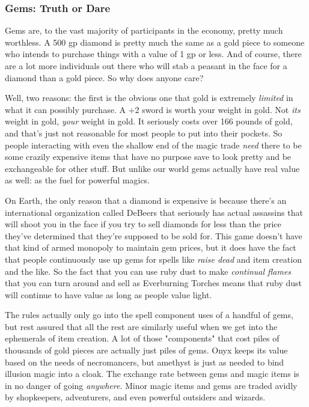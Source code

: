 \subsubsection{Gems: Truth or Dare}

Gems are, to the vast majority of participants in the economy, pretty much worthless. A 500 gp diamond is pretty much the same as a gold piece to someone who intends to purchase things with a value of 1 gp or less. And of course, there are a lot more individuals out there who will stab a peasant in the face for a diamond than a gold piece. So why does anyone care?

Well, two reasons: the first is the obvious one that gold is extremely \textit{limited} in what it can possibly purchase. A +2 sword is worth your weight in gold. Not \textit{its} weight in gold, \textit{your} weight in gold. It seriously costs over 166 pounds of gold, and that's just not reasonable for most people to put into their pockets. So people interacting with even the shallow end of the magic trade \textit{need} there to be some crazily expensive items that have no purpose save to look pretty and be exchangeable for other stuff. But unlike our world gems actually have real value as well: as the fuel for powerful magics.

On Earth, the only reason that a diamond is expensive is because there's an international organization called DeBeers that seriously has actual assassins that will shoot you in the face if you try to sell diamonds for less than the price they've determined that they're supposed to be sold for. This game doesn't have that kind of armed monopoly to maintain gem prices, but it does have the fact that people continuously use up gems for spells like \textit{raise dead} and item creation and the like. So the fact that you can use ruby dust to make \textit{continual flames} that you can turn around and sell as Everburning Torches means that ruby dust will continue to have value as long as people value light.

The rules actually only go into the spell component uses of a handful of gems, but rest assured that all the rest are similarly useful when we get into the ephemerals of item creation. A lot of those "components" that cost piles of thousands of gold pieces are actually just piles of gems. Onyx keeps its value based on the needs of necromancers, but amethyst is just as needed to bind illusion magic into a cloak. The exchange rate between gems and magic items is in no danger of going \textit{anywhere}. Minor magic items and gems are traded avidly by shopkeepers, adventurers, and even powerful outsiders and wizards.

